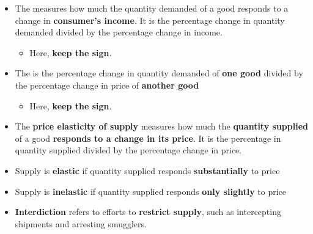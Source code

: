 \documentclass[12pt,a4paper]{article}
\begin{document}


\begin{itemize}
    \item The  measures how much the quantity demanded of a good responds to a change in \textbf{consumer's income}. It is the percentage change in quantity demanded divided by the percentage change in income.
        \begin{itemize}
            \item Here, \textbf{keep the sign}. 
        \end{itemize}

    \item The  is the percentage change in quantity demanded of \textbf{one good} divided by the percentage change in price of \textbf{another good}
        \begin{itemize}
            \item Here, \textbf{keep the sign}. 
        \end{itemize}
\end{itemize}


\begin{itemize}
    \item The \textbf{price elasticity of supply} measures how much the \textbf{quantity supplied} of a good \textbf{responds to a change in its price}. It is the percentage in quantity supplied divided by the percentage change in price.
    \item Supply is \textbf{elastic} if quantity supplied responds \textbf{substantially} to price
    \item Supply is \textbf{inelastic} if quantity supplied responds \textbf{only slightly} to price
\end{itemize}


\begin{itemize}
    \item \textbf{Interdiction} refers to efforts to \textbf{restrict supply}, such as intercepting shipments and arresting smugglers.
\end{itemize}
\end{document}
